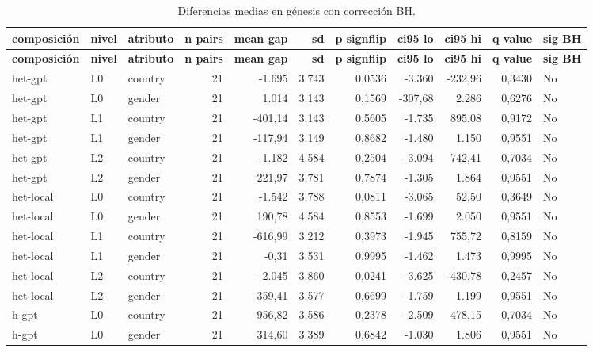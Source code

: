 \begin{landscape}
\scriptsize
\begin{longtable}{lllrrrrrrrl}
\caption{Diferencias medias en génesis con corrección BH.}\label{tab:t03}\\
\hline
\textbf{composición} & \textbf{nivel} & \textbf{atributo} & \textbf{n pairs} & \textbf{mean gap} & \textbf{sd} & \textbf{p signflip} & \textbf{ci95 lo} & \textbf{ci95 hi} & \textbf{q value} & \textbf{sig BH} \\
\hline
\endfirsthead
\hline
\textbf{composición} & \textbf{nivel} & \textbf{atributo} & \textbf{n pairs} & \textbf{mean gap} & \textbf{sd} & \textbf{p signflip} & \textbf{ci95 lo} & \textbf{ci95 hi} & \textbf{q value} & \textbf{sig BH} \\
\hline
\endhead
\hline
\endfoot
het-gpt & L0 & country & 21 & -1.695 & 3.743 & 0,0536 & -3.360 & -232,96 & 0,3430 & No \\
het-gpt & L0 & gender & 21 & 1.014 & 3.143 & 0,1569 & -307,68 & 2.286 & 0,6276 & No \\
het-gpt & L1 & country & 21 & -401,14 & 3.143 & 0,5605 & -1.735 & 895,08 & 0,9172 & No \\
het-gpt & L1 & gender & 21 & -117,94 & 3.149 & 0,8682 & -1.480 & 1.150 & 0,9551 & No \\
het-gpt & L2 & country & 21 & -1.182 & 4.584 & 0,2504 & -3.094 & 742,41 & 0,7034 & No \\
het-gpt & L2 & gender & 21 & 221,97 & 3.781 & 0,7874 & -1.305 & 1.864 & 0,9551 & No \\
het-local & L0 & country & 21 & -1.542 & 3.788 & 0,0811 & -3.065 & 52,50 & 0,3649 & No \\
het-local & L0 & gender & 21 & 190,78 & 4.584 & 0,8553 & -1.699 & 2.050 & 0,9551 & No \\
het-local & L1 & country & 21 & -616,99 & 3.212 & 0,3973 & -1.945 & 755,72 & 0,8159 & No \\
het-local & L1 & gender & 21 & -0,31 & 3.531 & 0,9995 & -1.462 & 1.473 & 0,9995 & No \\
het-local & L2 & country & 21 & -2.045 & 3.860 & 0,0241 & -3.625 & -430,78 & 0,2457 & No \\
het-local & L2 & gender & 21 & -359,41 & 3.577 & 0,6699 & -1.759 & 1.199 & 0,9551 & No \\
h-gpt & L0 & country & 21 & -956,82 & 3.586 & 0,2378 & -2.509 & 478,15 & 0,7034 & No \\
h-gpt & L0 & gender & 21 & 314,60 & 3.389 & 0,6842 & -1.030 & 1.806 & 0,9551 & No \\

\end{longtable}
\end{landscape}
